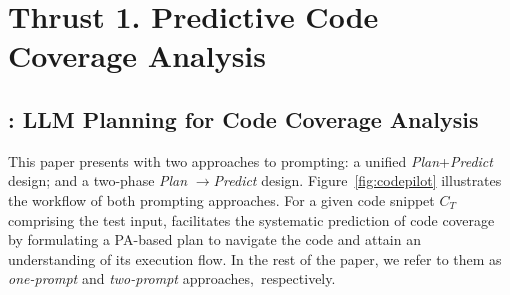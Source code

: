 \section{Thrust 1. Predictive Code Coverage Analysis}
\label{sec:thrust1}

\subsection{{\cctool}: LLM Planning for Code Coverage Analysis}
\label{sec:approach_overview}





%
This paper presents {\cctool} with two approaches to prompting: a
unified \textit{Plan}+\textit{Predict} design; and a two-phase
\textit{Plan} $\xrightarrow{}$\textit{Predict} design.
Figure~\ref{fig:codepilot} illustrates the workflow of both prompting
approaches.
For a given code snippet $C_T$ comprising the test input, {\cctool}
facilitates the systematic prediction of code coverage by formulating
a PA-based plan to navigate the code and attain an
understanding of its execution flow.  In the rest of the paper,
we refer to them as {\em one-prompt} and {\em two-prompt}
approaches,~respectively.


